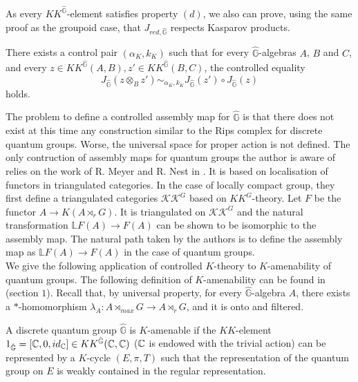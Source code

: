 As every $KK^{\hat{\mathbb G}}$-element satisfies property $(d)$, we also can prove, using the same proof as the groupoid case, that $J_{red,\hat{\mathbb G}}$ respects Kasparov products.

\begin{prop} There exists a control pair $(\alpha_K,k_K)$ such that for every $\hat{\mathbb G}$-algebras $A$, $B$ and $C$, and every $z\in KK^{\hat{\mathbb G}}(A,B),z'\in KK^{\hat{\mathbb G}}(B,C)$, the controlled equality
\[J_{\hat{\mathbb G}}(z\otimes_B z') \sim_{\alpha_K,k_K} J_{\hat{\mathbb G}}(z')\circ J_{\hat{\mathbb G}}(z)\]
holds.
\end{prop}

The problem to define a controlled assembly map for $\hat{\mathbb G}$ is that there does not exist at this time any construction similar to the Rips complex for discrete quantum groups. Worse, the universal space for proper action is not defined. The only contruction of assembly maps for quantum groups the author is aware of relies on the work of R. Meyer and R. Nest in \cite{MeyerNest}. It is based on localisation of functors in triangulated categories. In the case of locally compact group, they first define a triangulated categories $\mathcal {KK}^G$ based on $KK^G$-theory. Let $F$ be the functor $A\rightarrow K(A \rtimes_r G)$. It is triangulated on $\mathcal {KK}^G$ and the natural transformation $\mathbb L F(A)\rightarrow F(A)$ can be shown to be isomorphic to the assembly map. The natural path taken by the authors is to define the assembly map as $\mathbb L F(A)\rightarrow F(A)$ in the case of quantum groups.\\

We give the following application of controlled $K$-theory to $K$-amenability of quantum groups. The following definition of $K$-amenability can be found in \cite{VergniouxKamenability} (section $1$). Recall that, by universal property, for every $\hat{\mathbb G}$-algebra $A$, there exists a $*$-homomorphism $\lambda_A : A\rtimes_{max} G \rightarrow A\rtimes_{r} G$, and it is onto and filtered.

\begin{definition}
A discrete quantum group $\hat{\mathbb G}$ is $K$-amenable if the $KK$-element $1_{\hat{\mathbb G}} = [\mathbb C, 0, id_\mathbb C]\in KK^{\hat{\mathbb G}}(\mathbb C,\mathbb C)$ ($\mathbb C$ is endowed with the trivial action) can be represented by a $K$-cycle $(E,\pi,T)$ such that the representation of the quantum group on $E$ is weakly contained in the regular representation.
\end{definition}

